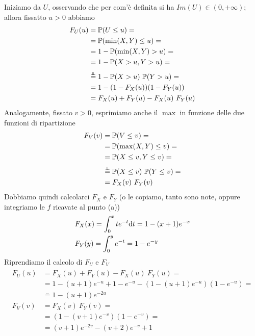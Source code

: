 \begin{enumerate}
Iniziamo da $U$, osservando che per com'è definita si ha $Im(U)\in(0,+\infty)$; allora fissatto $u>0$ abbiamo
\begin{gather*}
\begin{aligned}
F_U(u)&=\PP(U\leq u)=\\
&=\PP(\min(X,Y)\leq u)=         \\
&=1- \PP(\min(X,Y)> u)=        \\
&= 1-\PP(X>u,Y>u)=        \\
&\overset{\underset{\indep}{}}{=}1-\PP(X>u)\ \PP(Y>u)=         \\
&= 1-(1-F_X(u))(1-F_Y(u))        \\
&=F_X(u)+F_Y(u)-F_X(u)\ F_Y(u)         
\end{aligned}
\end{gather*}
Analogamente, fissato $v>0$, esprimiamo anche il $\max$ in funzione delle due funzioni di ripartizione
\begin{gather*}
\begin{aligned}
F_V(v)&=\PP(V\leq v)=\\
&=\PP(\max(X,Y)\leq v)=         \\
&=\PP(X\leq v,Y\leq v)=        \\
&\overset{\underset{\indep}{}}{=}\PP(X\leq v)\ \PP(Y\leq v)=         \\
&=F_X(v)\ F_Y(v)      
\end{aligned}
\end{gather*}
Dobbiamo quindi calcolarci $F_X$ e $F_Y$ (o le copiamo, tanto sono note, oppure integriamo le $f$ ricavate al punto (a))
\begin{gather*}
\begin{aligned}
&F_X(x)=\int_0^x te^{-t}\mathrm{d} t=1-(x+1)e^{-x}\\  
&F_Y(y)=\int_0^y e^{-t}=1-e^{-y}
\end{aligned}
\end{gather*}
Riprendiamo il calcolo di $F_U$ e $F_V$
\begin{gather*}
\begin{aligned}
F_U(u)&=F_X(u)+F_Y(u)-F_X(u)\ F_Y(u)=\\
&=1-(u+1)e^{-u} + 1-e^{-u} -(1-(u+1)e^{-u})(1-e^{-u})=\\ 
&\overset{\underset{\cdots}{}}{=}1-(u+1)e^{-2u} \\
F_V(v)&=F_X(v)\ F_Y(v)=\\
&=(1-(v+1)e^{-v})(1-e^{-v})=\\
&\overset{\underset{\cdots}{}}{=}(v+1)e^{-2v}-(v+2)e^{-v}+1
\end{aligned}

\end{gather*}
\end{enumerate}
